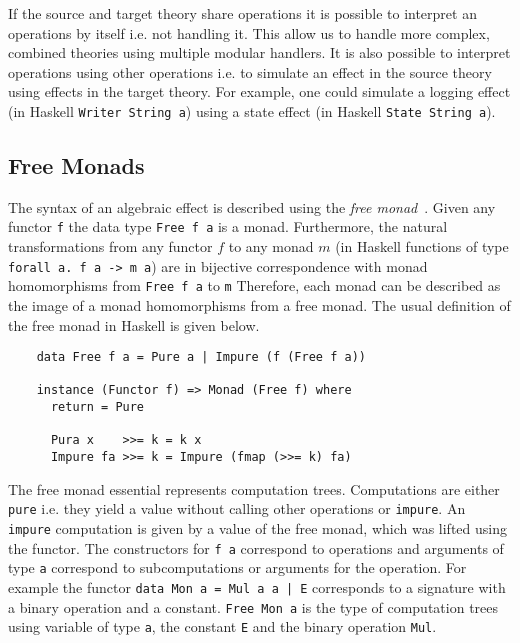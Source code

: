 If the source and target theory share operations it is possible to interpret an
operations by itself i.e. not handling it.
This allow us to handle more complex, combined theories using multiple modular
handlers.
It is also possible to interpret operations using other operations i.e. to
simulate an effect in the source theory using effects in the target theory.
For example, one could simulate a logging effect (in Haskell \texttt{Writer String
  a}) using a state effect (in Haskell \texttt{State String a}).


\subsection{Free Monads}
\label{preliminaries:free-monad}

The syntax of an algebraic effect is described using the \textit{free
monad}~\cite{DBLP:journals/jfp/Swierstra08}.
Given any functor \texttt{f} the data type \texttt{Free f a} is a monad.
Furthermore, the natural transformations from any functor $f$ to any monad $m$
(in Haskell functions of type \texttt{forall a. f a -> m a}) are in bijective
correspondence with monad homomorphisms from \texttt{Free f a} to \texttt{m}
Therefore, each monad can be described as the image of a monad homomorphisms
from a free monad.
The usual definition of the free monad in Haskell is given below.

\begin{verbatim}
    data Free f a = Pure a | Impure (f (Free f a))

    instance (Functor f) => Monad (Free f) where
      return = Pure

      Pura x    >>= k = k x
      Impure fa >>= k = Impure (fmap (>>= k) fa)
\end{verbatim}
The free monad essential represents computation trees.
Computations are either \texttt{pure} i.e. they yield a value without calling
other operations or \texttt{impure}.
An \texttt{impure} computation is given by a value of the free monad, which was
lifted using the functor.
The constructors for \texttt{f a} correspond to operations and arguments of type
\texttt{a} correspond to subcomputations or arguments for the operation.
For example the functor \texttt{data Mon a = Mul a a | E}
corresponds to a signature with a binary operation and a constant.
\texttt{Free Mon a} is the type of computation trees using variable
of type \texttt{a}, the constant \texttt{E} and the binary operation
\texttt{Mul}.

